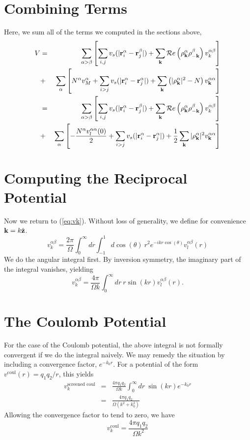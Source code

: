 \documentclass{article}
\begin{document}
\section{Combining Terms}
Here, we sum all of the terms we computed in the sections above,
\begin{eqnarray}
V & = & \sum_{\alpha > \beta} \left[\sum_{i,j} v_s(|\mathbf{r}_i^\alpha
  -\mathbf{r}_j^\beta|) + \sum_{\mathbf{k}} \mathcal{R}e\left(\rho_{\mathbf{k}}^\alpha
  \rho_{-\mathbf{k}}^\beta\right)v^{\alpha\beta}_k    \right] \nonumber \\
& + & \sum_\alpha \left[ N^\alpha v_M^\alpha + \sum_{i>j} v_s(|\mathbf{r}_i^\alpha -
  \mathbf{r}_j^\alpha|) + \sum_{\mathbf{k}} \left( |\rho_{\mathbf{k}}^\alpha|^2 -
  N\right) v^{\alpha\alpha}_{\mathbf{k}} \right] \nonumber \\
& = & \sum_{\alpha > \beta} \left[\sum_{i,j} v_s(|\mathbf{r}_i^\alpha
  -\mathbf{r}_j^\beta|) + \sum_{\mathbf{k}} \mathcal{R}e\left(\rho_{\mathbf{k}}^\alpha
  \rho_{-\mathbf{k}}^\beta\right) v^{\alpha \beta}_k   \right] \nonumber \\
& + & \sum_\alpha \left[ -\frac{N^\alpha v_l^{\alpha \alpha}(0)}{2}  + \sum_{i>j} v_s(|\mathbf{r}_i^\alpha -
  \mathbf{r}_j^\alpha|) + \frac{1}{2} \sum_{\mathbf{k}} |\rho_{\mathbf{k}}^\alpha|^2 v^{\alpha\alpha}_{\mathbf{k}} \right] 
\end{eqnarray}

\section {Computing the Reciprocal Potential}
Now we return to (\ref{eq:vk}).  Without loss of generality, we define
for convenience $\mathbf{k} = k\hat{\mathbf{z}}$.
\begin{equation}
v^{\alpha \beta}_k = \frac{2\pi}{\Omega} \int_0^\infty dr \int_{-1}^1
  d\cos(\theta) \ r^2 e^{-i k r \cos(\theta)} v_l^{\alpha \beta}(r)
\end{equation}
We do the angular integral first.  By inversion symmetry, the
imaginary part of the integral vanishes, yielding
\begin{equation}
v^{\alpha \beta}_k = \frac{4\pi}{\Omega k}\int _0^\infty dr\ r \sin(kr)
v^{\alpha \beta}_l(r).
\label{eq:vkint}
\end{equation}

\section{The Coulomb Potential}
For the case of the Coulomb potential, the above integral is not
formally convergent if we do the integral naively. We may remedy the
situation by including a convergence factor, $e^{-k_0 r}$.  For a
potential of the form $v^\text{coul}(r) = q_1 q_2/r$, this yields
\begin{eqnarray}
v^{\text{screened coul}}_k & = & \frac{4\pi q_1 q_2}{\Omega k} \int_0^\infty dr\ \sin(kr)
e^{-k_0r} \\ 
& = & \frac{4\pi q_1 q_2}{\Omega (k^2 + k_0^2)}
\end{eqnarray}
Allowing the convergence factor to tend to zero, we have
\begin{equation}
v_k^\text{coul} = \frac{4 \pi q_1 q_2}{\Omega k^2}
\end{equation}
\end{document}
